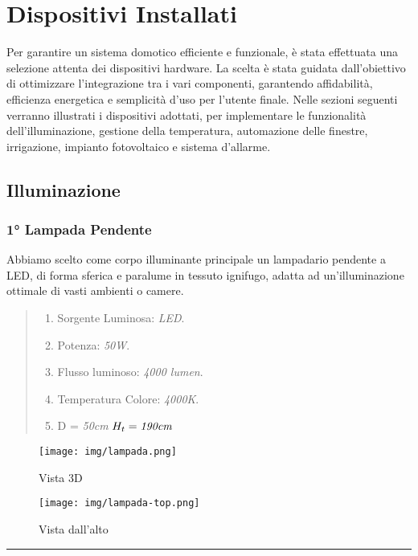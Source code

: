 \documentclass[italian, 12pt, a4paper]{article}
\begin{document}
\section{Dispositivi Installati}
Per garantire un sistema domotico efficiente e funzionale, è stata effettuata una selezione attenta dei dispositivi hardware. La scelta è stata guidata dall’obiettivo di ottimizzare l’integrazione tra i vari componenti, garantendo affidabilità, efficienza energetica e semplicità d’uso per l’utente finale.
Nelle sezioni seguenti verranno illustrati i dispositivi adottati, per implementare le funzionalità dell'illuminazione, gestione della temperatura, automazione delle finestre, irrigazione, impianto fotovoltaico e sistema d'allarme.
\subsection{Illuminazione}
\subsubsection{1° Lampada Pendente}
Abbiamo scelto come corpo illuminante principale un lampadario pendente a LED, di forma sferica e paralume in tessuto ignifugo, adatta ad un'illuminazione ottimale di vasti ambienti o camere.
\begin{quote}
    \begin{enumerate}
        \item Sorgente Luminosa: \emph{LED}.
        \item Potenza: \emph{50W}.
        \item Flusso luminoso: \emph{4000 lumen}.
        \item Temperatura Colore: \emph{4000K}.
        \item D = \emph{50cm} $H_t = \emph{190cm}$
    \end{enumerate}
\end{quote}
\begin{figure}[h!]
    \centering
    \begin{minipage}{0.45\textwidth}
        \centering
        \texttt{[image: img/lampada.png]} %
        \caption{Vista 3D}
    \end{minipage} \hfill
    \begin{minipage}{0.45\textwidth}
        \centering
        \texttt{[image: img/lampada-top.png]} %
        \caption{Vista dall'alto}
    \end{minipage}
\end{figure}
\hrule
\end{document}
